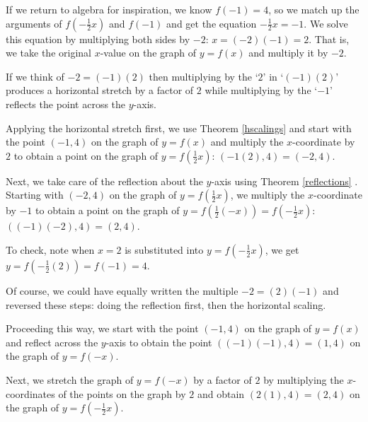 \documentclass{ximera}
\begin{document}
\begin{example}
\begin{enumerate}
\begin{enumerate}
 \smallskip
 
  If we return to algebra for inspiration, we know $f(-1) = 4$, so we match up the arguments of $f\left(-\frac{1}{2} x \right)$ and $f(-1)$ and get the equation $-\frac{1}{2} x  = -1$. We solve this equation by multiplying both sides by $-2$:  $x = (-2)(-1) = 2$.  That is, we take the original $x$-value on the graph of $y=f(x)$ and multiply it by $-2$.  
  
  \smallskip
  
  If we think of $-2= (-1)(2)$ then multiplying by the `$2$' in `$(-1)(2)$' produces a horizontal stretch by a factor of $2$ while multiplying by the `$-1$'  reflects the point across the $y$-axis. 
  
  \smallskip
  
   Applying the horizontal stretch first, we use Theorem \ref{hscalings} and start with the point $(-1,4)$ on the graph of $y=f(x)$ and multiply the $x$-coordinate by $2$ to obtain a point on the graph of $y=f\left(\frac{1}{2} x\right)$:  $(-1(2), 4) = (-2,4)$.   
   
   \smallskip
   
   Next, we take care of the reflection about the $y$-axis using  Theorem \ref{reflections} .  Starting with $(-2,4)$ on the graph of $y=f\left(\frac{1}{2} x \right)$, we multiply the $x$-coordinate by $-1$ to obtain a point on the graph of  $y =  f\left(\frac{1}{2} (-x) \right) =  f\left(-\frac{1}{2} x \right)$:   $((-1)(-2),4) = (2,4)$. 
   
 \smallskip
   
 To check, note when $x=2$ is substituted into $y =  f\left(-\frac{1}{2} x \right)$, we get $y =  f\left(-\frac{1}{2} (2)  \right) = f(-1) = 4$.
 
 \smallskip
 
 Of course, we could have equally written the multiple $-2 = (2)(-1)$ and reversed these steps:  doing the reflection first, then the horizontal scaling. 
 
 \smallskip
 
Proceeding this way, we start with the point $(-1,4)$ on the graph of $y=f(x)$ and reflect across the $y$-axis to obtain the point $((-1)(-1), 4) = (1,4)$ on the graph of $y = f(-x)$.  

\smallskip

Next, we stretch the graph of $y=f(-x)$ by a factor of $2$ by multiplying the $x$-coordinates of the points on the graph by $2$ and obtain $(2(1), 4) = (2,4)$ on the graph of $y=f\left(-\frac{1}{2} x\right)$.  
 

\end{enumerate}
\end{enumerate}
\end{example}
\end{document}
